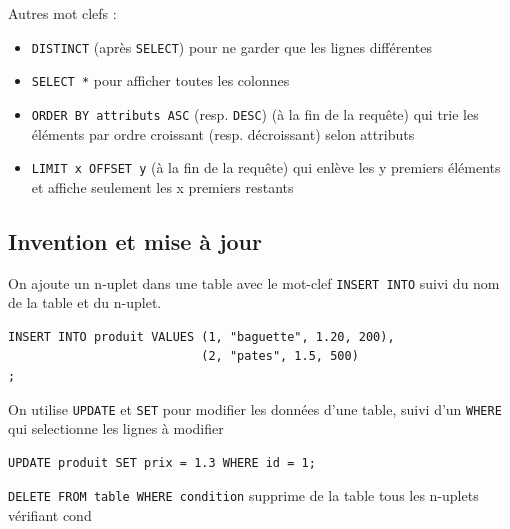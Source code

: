 \begin{syntaxe} Autres mot clefs :
	\begin{itemize}[label=]
		\item \texttt{DISTINCT} (après \texttt{SELECT}) pour ne garder que les lignes différentes
		
		\item \texttt{SELECT *} pour afficher toutes les colonnes
		
		\item \texttt{ORDER BY attributs ASC} (resp. \texttt{DESC}) (à la fin de la requête) qui trie les éléments par ordre croissant (resp. décroissant) selon attributs
		
		\item \texttt{LIMIT x OFFSET y} (à la fin de la requête) qui enlève les y premiers éléments et affiche seulement les x premiers restants
	\end{itemize}
\end{syntaxe}

\subsection{Invention et mise à jour}

\begin{syntaxe}
	On ajoute un n-uplet dans une table avec le mot-clef \texttt{INSERT INTO} suivi du nom de la table et du n-uplet.
\end{syntaxe}

\begin{example}
	\begin{lstlisting}
INSERT INTO produit VALUES (1, "baguette", 1.20, 200), 
                           (2, "pates", 1.5, 500)
;
	\end{lstlisting}
\end{example}

\begin{syntaxe}
	 On utilise \texttt{UPDATE} et \texttt{SET} pour modifier les données d'une table, suivi d'un \texttt{WHERE} qui selectionne les lignes à modifier
\end{syntaxe}

\begin{example}
	\begin{lstlisting}
UPDATE produit SET prix = 1.3 WHERE id = 1;
	\end{lstlisting}
\end{example}

\begin{syntaxe}
	\texttt{DELETE FROM table WHERE condition} supprime de la table tous les n-uplets vérifiant cond
\end{syntaxe}

